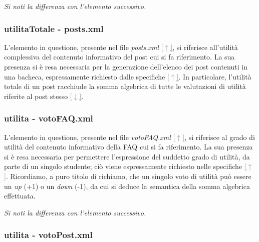 \documentclass [a4paper,11pt]{book}
\begin{document}
\medskip

\emph{Si noti la differenza con l'elemento successivo.}

\medskip

\subsubsection{utilitaTotale - posts.xml}

L'elemento in questione, presente nel file \emph{posts.xml} \hyperref[sec:posts]{\textcolor{gray}{[$\uparrow$]}}, si riferisce all'utilità complessiva del contenuto informativo del post cui si fa riferimento. La sua presenza si è resa necessaria per la generazione dell'elenco dei post contenuti in una bacheca, espressamente richiesto dalle specifiche \hyperref[sec:specifiche]{\textcolor{gray}{[$\uparrow$]}}. In particolare, l'utilità totale di un post racchiude la somma algebrica di tutte le valutazioni di utilità riferite al post stesso \hyperref[sec:votopost]{\textcolor{gray}{[$\downarrow$]}}.

\medskip

\subsubsection{utilita - votoFAQ.xml}

\label{sec:votofaq}

L'elemento in questione, presente nel file \emph{votoFAQ.xml} \hyperref[sec:votoFAQ]{\textcolor{gray}{[$\uparrow$]}}, si riferisce al grado di utilità del contenuto informativo della FAQ cui si fa riferimento. La sua presenza si è resa necessaria per permettere l'espressione del suddetto grado di utilità, da parte di un singolo studente; ciò viene espressamente richiesto nelle specifiche \hyperref[sec:specifiche]{\textcolor{gray}{[$\uparrow$]}}. Ricordiamo, a puro titolo di richiamo, che un singolo voto di utilità può essere un \emph{up} (+1) o un \emph{down} (-1), da cui si deduce la semantica della somma algebrica effettuata.

\medskip

\emph{Si noti la differenza con l'elemento successivo.}

\medskip

\subsubsection{utilita - votoPost.xml}

\label{sec:votopost}
\end{document}
